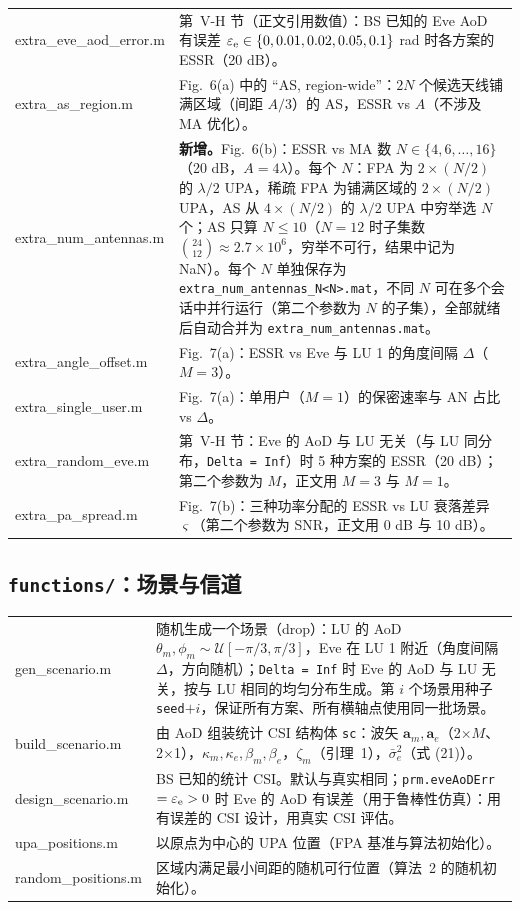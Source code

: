 \documentclass[11pt,a4paper]{ctexart}
\newcommand{\code}[1]{\texttt{#1}}
\begin{document}
\begin{longtable}{>{\ttfamily\small}p{4.6cm}p{11.2cm}}
extra\_eve\_aod\_error.m & 第~V-H 节（正文引用数值）：BS 已知的 Eve AoD 有误差 $\varepsilon_{\rm e}\in\{0,0.01,0.02,0.05,0.1\}$ rad 时各方案的 ESSR（20 dB）。\\
extra\_as\_region.m & Fig.~6(a) 中的 “AS, region-wide”：$2N$ 个候选天线铺满区域（间距 $A/3$）的 AS，ESSR vs $A$（不涉及 MA 优化）。\\
extra\_num\_antennas.m & \textbf{新增。}Fig.~6(b)：ESSR vs MA 数 $N\in\{4,6,\ldots,16\}$（20 dB，$A=4\lambda$）。每个 $N$：FPA 为 $2\times(N/2)$ 的 $\lambda/2$ UPA，稀疏 FPA 为铺满区域的 $2\times(N/2)$ UPA，AS 从 $4\times(N/2)$ 的 $\lambda/2$ UPA 中穷举选 $N$ 个；AS 只算 $N\le10$（$N=12$ 时子集数 $\binom{24}{12}\approx2.7\times10^6$，穷举不可行，结果中记为 NaN）。每个 $N$ 单独保存为 \code{extra\_num\_antennas\_N<N>.mat}，不同 $N$ 可在多个会话中并行运行（第二个参数为 $N$ 的子集），全部就绪后自动合并为 \code{extra\_num\_antennas.mat}。\\
extra\_angle\_offset.m & Fig.~7(a)：ESSR vs Eve 与 LU 1 的角度间隔 $\Delta$（$M=3$）。\\
extra\_single\_user.m & Fig.~7(a)：单用户（$M=1$）的保密速率与 AN 占比 vs $\Delta$。\\
extra\_random\_eve.m & 第~V-H 节：Eve 的 AoD 与 LU 无关（与 LU 同分布，\code{Delta = Inf}）时 5 种方案的 ESSR（20 dB）；第二个参数为 $M$，正文用 $M=3$ 与 $M=1$。\\
extra\_pa\_spread.m & Fig.~7(b)：三种功率分配的 ESSR vs LU 衰落差异 $\varsigma$（第二个参数为 SNR，正文用 0 dB 与 10 dB）。\\
\bottomrule
\end{longtable}

\subsection{\code{functions/}：场景与信道}
\begin{longtable}{>{\ttfamily\small}p{4.6cm}p{11.2cm}}
\toprule
gen\_scenario.m & 随机生成一个场景（drop）：LU 的 AoD $\theta_m,\phi_m\sim\mathcal U[-\pi/3,\pi/3]$，Eve 在 LU 1 附近（角度间隔 $\Delta$，方向随机）；\code{Delta = Inf} 时 Eve 的 AoD 与 LU 无关，按与 LU 相同的均匀分布生成。第 $i$ 个场景用种子 \code{seed}$+i$，保证所有方案、所有横轴点使用同一批场景。\\
build\_scenario.m & 由 AoD 组装统计 CSI 结构体 \code{sc}：波矢 $\mathbf a_m,\mathbf a_e$（2$\times M$、2$\times$1），$\kappa_m,\kappa_e,\beta_m,\beta_e$，$\zeta_m$（引理~1），$\bar\sigma_e^2$（式 (21)）。\\
design\_scenario.m & BS 已知的统计 CSI。默认与真实相同；\code{prm.eveAoDErr}$=\varepsilon_{\rm e}>0$ 时 Eve 的 AoD 有误差（用于鲁棒性仿真）：用有误差的 CSI 设计，用真实 CSI 评估。\\
upa\_positions.m & 以原点为中心的 UPA 位置（FPA 基准与算法初始化）。\\
random\_positions.m & 区域内满足最小间距的随机可行位置（算法~2 的随机初始化）。\\
\bottomrule
\end{longtable}
\end{document}
